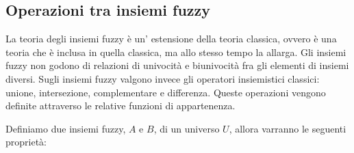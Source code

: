 \documentclass[a4paper,12pt]{report}
\begin{document}
\subsection*{Operazioni tra insiemi fuzzy}
La teoria degli insiemi fuzzy è un' estensione della teoria classica, ovvero è una teoria che è inclusa in quella classica, ma allo stesso tempo la allarga. 
Gli insiemi fuzzy non godono di relazioni di univocità e biunivocità fra gli elementi di insiemi diversi.
Sugli insiemi fuzzy valgono invece gli operatori insiemistici classici: unione, intersezione, complementare e differenza.
Queste operazioni vengono definite attraverso le relative funzioni di appartenenza.

\bigskip

Definiamo due insiemi fuzzy, $A$ e $B$, di un universo $U$, allora varranno le seguenti proprietà:
\end{document}
